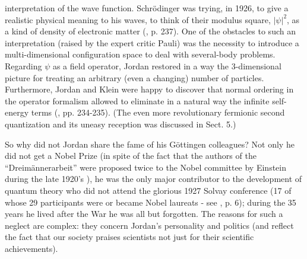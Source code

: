 interpretation of the wave function. Schr\"odinger was trying, in 1926, to give a realistic physical meaning to his waves, to think of 
their modulus square, $|\psi|^2$, as a kind of density of electronic matter (\cite{Dar}, p. 237). One of the obstacles to such an 
interpretation (raised by the expert critic Pauli) was the necessity to introduce a multi-dimensional configuration space to deal with 
several-body problems. Regarding $\psi$ as a field operator, Jordan restored in a way the 3-dimensional picture for treating 
an arbitrary (even a changing) number of particles. Furthermore, Jordan and Klein \cite{JK27} 
were happy to discover that normal ordering in the operator formalism allowed to eliminate in a natural way the
infinite self-energy terms (\cite{Dar}, pp. 234-235). (The even more revolutionary fermionic second quantization
and its uneasy reception was discussed in Sect.  5.)

So why did not Jordan share the fame of his G\"ottingen colleagues? Not only he did not get a Nobel
Prize (in spite of the fact that the authors of the ``Dreim\"annerarbeit'' were proposed twice to the
Nobel committee by Einstein during the late 1920's \cite{S06}), he was the only major contributor to
the development of quantum theory who did not attend the glorious 1927 Solvay conference (17 of whose
29 participants were or became Nobel laureats - see \cite{Sch}, p. 6); during the 35 years he lived
after the War he was all but forgotten. The reasons for such a neglect are complex: they concern
Jordan's personality and politics (and reflect the fact that our society praises scientists not just
for their scientific achievements).

